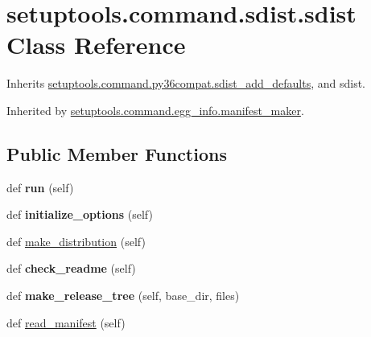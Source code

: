\hypertarget{classsetuptools_1_1command_1_1sdist_1_1sdist}{}\section{setuptools.\+command.\+sdist.\+sdist Class Reference}
\label{classsetuptools_1_1command_1_1sdist_1_1sdist}


Inherits \hyperlink{classsetuptools_1_1command_1_1py36compat_1_1sdist__add__defaults}{setuptools.\+command.\+py36compat.\+sdist\+\_\+add\+\_\+defaults}, and sdist.



Inherited by \hyperlink{classsetuptools_1_1command_1_1egg__info_1_1manifest__maker}{setuptools.\+command.\+egg\+\_\+info.\+manifest\+\_\+maker}.

\subsection*{Public Member Functions}
\begin{DoxyCompactItemize}
\item 
\mbox{\label{classsetuptools_1_1command_1_1sdist_1_1sdist_aff1d5d55ae04ff524b1b5ba77818bf58}} 
def {\bfseries run} (self)
\item 
\mbox{\label{classsetuptools_1_1command_1_1sdist_1_1sdist_a96d37cc74ac618035e3ffb7bbaf99c66}} 
def {\bfseries initialize\+\_\+options} (self)
\item 
def \hyperlink{classsetuptools_1_1command_1_1sdist_1_1sdist_ae6d47a19d2e20da1f420b9ce2daeec72}{make\+\_\+distribution} (self)
\item 
\mbox{\label{classsetuptools_1_1command_1_1sdist_1_1sdist_a5339db604af6411e31796c32142b0365}} 
def {\bfseries check\+\_\+readme} (self)
\item 
\mbox{\label{classsetuptools_1_1command_1_1sdist_1_1sdist_ad498b313d40b183b6edb6e66956dbf0b}} 
def {\bfseries make\+\_\+release\+\_\+tree} (self, base\+\_\+dir, files)
\item 
def \hyperlink{classsetuptools_1_1command_1_1sdist_1_1sdist_a1b7a74f9d8dda385451371dea8b113d1}{read\+\_\+manifest} (self)
\end{DoxyCompactItemize}
